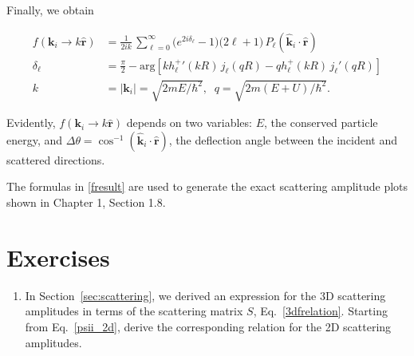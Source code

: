 \documentclass[pra,12pt]{revtex4-2}
\begin{document}
Finally, we obtain
\begin{framed}
\begin{equation}
  \begin{aligned}f(\mathbf{k}_i \rightarrow k\hat{\mathbf{r}}) &= \frac{1}{2ik}\, \sum_{\ell =0}^\infty \big(e^{2i\delta_\ell} - 1\big) \big(2\ell+1\big)\, P_{\ell}(\hat{\mathbf{k}}_i\cdot \hat{\mathbf{r}}) \\ \delta_\ell &= \frac{\pi}{2} - \mathrm{arg}\!\left[k{h_\ell^+}'(kR) \, j_\ell(qR) - qh_\ell^+(kR)\, j_\ell'(qR)\right] \\ k &= |\mathbf{k}_i| = \sqrt{2mE/\hbar^2}, \;\; q = \sqrt{2m(E+U)/\hbar^2}.\end{aligned}
  \label{fresult}
\end{equation}
\end{framed}
\noindent
Evidently, $f(\mathbf{k}_i \rightarrow k\hat{\mathbf{r}})$ depends on
two variables: $E$, the conserved particle energy, and $\Delta \theta
= \cos^{-1}(\hat{\mathbf{k}}_i\cdot \hat{\mathbf{r}})$, the deflection
angle between the incident and scattered directions.

The formulas in \eqref{fresult} are used to generate the exact
scattering amplitude plots shown in Chapter 1, Section 1.8.


\section*{Exercises}

\begin{enumerate}
\item \label{ex:2dscattering} In Section~\ref{sec:scattering}, we
  derived an expression for the 3D scattering amplitudes in terms of
  the scattering matrix $S$, Eq.~\eqref{3dfrelation}.  Starting from
  Eq.~\eqref{psii_2d}, derive the corresponding relation for the 2D
  scattering amplitudes.

\end{enumerate}
\end{document}
